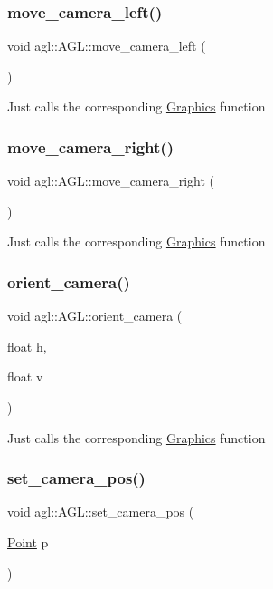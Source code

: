 \subsubsection{\texorpdfstring{move\_camera\_left()}{move\_camera\_left()}}
{\footnotesize\ttfamily void agl\+::\+A\+G\+L\+::move\+\_\+camera\+\_\+left (\begin{DoxyParamCaption}{ }\end{DoxyParamCaption})}

Just calls the corresponding \mbox{\hyperlink{classagl_1_1Graphics}{Graphics}} function \mbox{\label{classagl_1_1AGL_a33dcc3992c41527b3148ca14bdb76c5f}} 
\subsubsection{\texorpdfstring{move\_camera\_right()}{move\_camera\_right()}}
{\footnotesize\ttfamily void agl\+::\+A\+G\+L\+::move\+\_\+camera\+\_\+right (\begin{DoxyParamCaption}{ }\end{DoxyParamCaption})}

Just calls the corresponding \mbox{\hyperlink{classagl_1_1Graphics}{Graphics}} function \mbox{\label{classagl_1_1AGL_a9c5161c4171079ee6d4a39427924770b}} 
\subsubsection{\texorpdfstring{orient\_camera()}{orient\_camera()}}
{\footnotesize\ttfamily void agl\+::\+A\+G\+L\+::orient\+\_\+camera (\begin{DoxyParamCaption}\item[{float}]{h,  }\item[{float}]{v }\end{DoxyParamCaption})}

Just calls the corresponding \mbox{\hyperlink{classagl_1_1Graphics}{Graphics}} function \mbox{\label{classagl_1_1AGL_a50d1ea2ee2e612e0606b1a8634396d89}} 
\subsubsection{\texorpdfstring{set\_camera\_pos()}{set\_camera\_pos()}}
{\footnotesize\ttfamily void agl\+::\+A\+G\+L\+::set\+\_\+camera\+\_\+pos (\begin{DoxyParamCaption}\item[{\mbox{\hyperlink{classagl_1_1Point}{Point}}}]{p }\end{DoxyParamCaption})}

